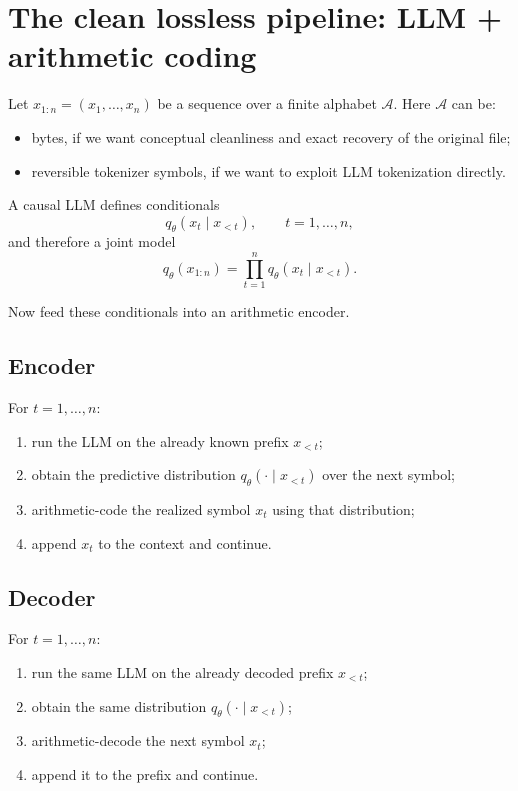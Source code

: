 \documentclass[11pt]{article}
\theoremstyle{remark}
\newcommand{\A}{\mathcal{A}}
\begin{document}
\section{The clean lossless pipeline: LLM + arithmetic coding}

Let $x_{1:n} = (x_1,\dots,x_n)$ be a sequence over a finite alphabet $\A$. Here $\A$ can be:
\begin{itemize}
    \item bytes, if we want conceptual cleanliness and exact recovery of the original file;
    \item reversible tokenizer symbols, if we want to exploit LLM tokenization directly.
\end{itemize}

A causal LLM defines conditionals
\[
q_\theta(x_t \mid x_{<t}), \qquad t=1,\dots,n,
\]
and therefore a joint model
\[
q_\theta(x_{1:n}) = \prod_{t=1}^n q_\theta(x_t \mid x_{<t}).
\]

Now feed these conditionals into an arithmetic encoder.

\subsection*{Encoder}
For $t=1,\dots,n$:
\begin{enumerate}
    \item run the LLM on the already known prefix $x_{<t}$;
    \item obtain the predictive distribution $q_\theta(\cdot\mid x_{<t})$ over the next symbol;
    \item arithmetic-code the realized symbol $x_t$ using that distribution;
    \item append $x_t$ to the context and continue.
\end{enumerate}

\subsection*{Decoder}
For $t=1,\dots,n$:
\begin{enumerate}
    \item run the same LLM on the already decoded prefix $x_{<t}$;
    \item obtain the same distribution $q_\theta(\cdot\mid x_{<t})$;
    \item arithmetic-decode the next symbol $x_t$;
    \item append it to the prefix and continue.
\end{enumerate}
\end{document}
